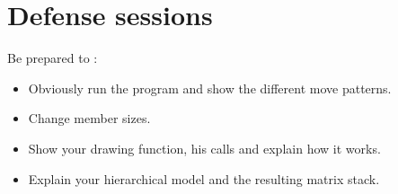\documentclass{42-en}
\begin{document}
\newpage
	\chapter {Defense sessions}
		Be prepared to :
		\begin{itemize}
			\item Obviously run the program and show the different move patterns.
			\item Change member sizes.
			\item Show your drawing function, his calls and explain how it works.
			\item Explain your hierarchical model and the resulting matrix stack.
		\end{itemize}

\end{document}
